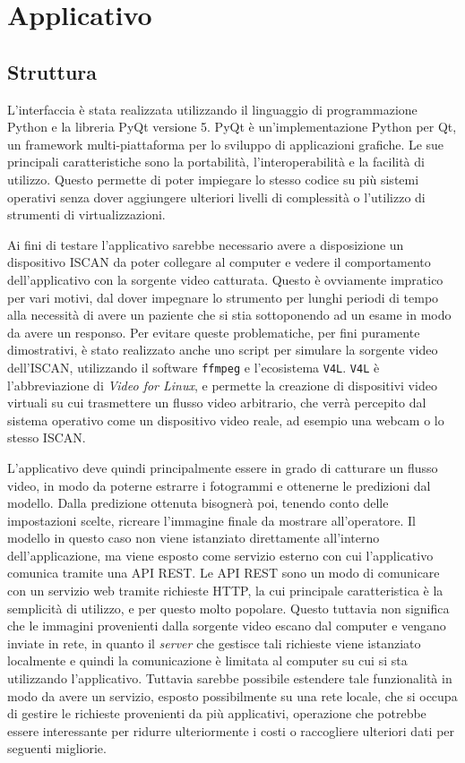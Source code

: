 \chapter{Applicativo}

\section{Struttura}

L'interfaccia è stata realizzata utilizzando il linguaggio
di programmazione Python e la libreria PyQt versione 5.
PyQt è un'implementazione Python per Qt, un framework
multi-piattaforma per lo sviluppo di applicazioni grafiche.
Le sue principali caratteristiche sono la portabilità,
l'interoperabilità e la facilità di utilizzo.
Questo permette di poter impiegare lo stesso codice
su più sistemi operativi senza dover aggiungere
ulteriori livelli di complessità o l'utilizzo
di strumenti di virtualizzazioni.

Ai fini di testare l'applicativo sarebbe necessario
avere a disposizione un dispositivo ISCAN da poter collegare
al computer e vedere il comportamento dell'applicativo con
la sorgente video catturata.
Questo è ovviamente impratico per vari motivi,
dal dover impegnare lo strumento per lunghi periodi di tempo
alla necessità di avere un paziente che si stia sottoponendo
ad un esame in modo da avere un responso.
Per evitare queste problematiche, per fini puramente
dimostrativi, è stato realizzato anche uno script
per simulare la sorgente video dell'ISCAN, utilizzando
il software {\tt ffmpeg} e l'ecosistema {\tt V4L}.
{\tt V4L} è l'abbreviazione di {\it Video for Linux},
e permette la creazione di dispositivi video virtuali
su cui trasmettere un flusso video arbitrario, che verrà
percepito dal sistema operativo come un dispositivo video
reale, ad esempio una webcam o lo stesso ISCAN.

L'applicativo deve quindi principalmente essere in grado
di catturare un flusso video, in modo da poterne estrarre
i fotogrammi e ottenerne le predizioni dal modello.
Dalla predizione ottenuta bisognerà poi, tenendo conto
delle impostazioni scelte, ricreare l'immagine finale
da mostrare all'operatore.
Il modello in questo caso non viene istanziato direttamente
all'interno dell'applicazione, ma viene esposto come servizio
esterno con cui l'applicativo comunica tramite una API REST.
Le API REST sono un modo di comunicare con un servizio web
tramite richieste HTTP, la cui principale caratteristica
è la semplicità di utilizzo, e per questo molto popolare.
Questo tuttavia non significa che le immagini provenienti
dalla sorgente video escano dal computer e vengano
inviate in rete, in quanto il {\it server} che gestisce
tali richieste viene istanziato localmente e quindi
la comunicazione è limitata al computer su cui si sta
utilizzando l'applicativo.
Tuttavia sarebbe possibile estendere tale funzionalità in modo
da avere un servizio, esposto possibilmente su una rete locale,
che si occupa di gestire le richieste provenienti da più
applicativi, operazione che potrebbe essere interessante
per ridurre ulteriormente i costi o raccogliere ulteriori
dati per seguenti migliorie.

